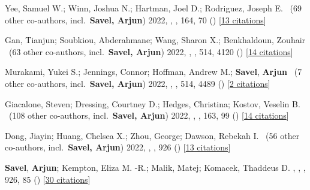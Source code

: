 \item[{\color{numcolor}\scriptsize13}] Yee, Samuel W.; Winn, Joshua N.; Hartman, Joel D.; Rodriguez, Joseph E. \etal\ ({69} other co-authors, incl.\ \textbf{Savel, Arjun}) 2022, , \aj, {164}, 70 () [\href{https://ui.adsabs.harvard.edu/abs/2022AJ....164...70Y}{13 citations}]

\item[{\color{numcolor}\scriptsize12}] Gan, Tianjun; Soubkiou, Abderahmane; Wang, Sharon X.; Benkhaldoun, Zouhair \etal\ ({63} other co-authors, incl.\ \textbf{Savel, Arjun}) 2022, , \mnras, {514}, 4120 () [\href{https://ui.adsabs.harvard.edu/abs/2022MNRAS.514.4120G}{14 citations}]

\item[{\color{numcolor}\scriptsize11}] Murakami, Yukei S.; Jennings, Connor; Hoffman, Andrew M.; \textbf{Savel}, \textbf{Arjun} \etal\ ({7} other co-authors, incl.\ \textbf{Savel, Arjun}) 2022, , \mnras, {514}, 4489 () [\href{https://ui.adsabs.harvard.edu/abs/2022MNRAS.514.4489M}{2 citations}]

\item[{\color{numcolor}\scriptsize10}] Giacalone, Steven; Dressing, Courtney D.; Hedges, Christina; Kostov, Veselin B. \etal\ ({108} other co-authors, incl.\ \textbf{Savel, Arjun}) 2022, , \aj, {163}, 99 () [\href{https://ui.adsabs.harvard.edu/abs/2022AJ....163...99G}{14 citations}]

\item[{\color{numcolor}\scriptsize9}] Dong, Jiayin; Huang, Chelsea X.; Zhou, George; Dawson, Rebekah I. \etal\ ({56} other co-authors, incl.\ \textbf{Savel, Arjun}) 2022, , \apj, {926} () [\href{https://ui.adsabs.harvard.edu/abs/2022ApJ...926L...7D}{13 citations}]

\item[{\color{numcolor}\scriptsize8}] \textbf{Savel}, \textbf{Arjun}; Kempton, Eliza M. -R.; Malik, Matej; Komacek, Thaddeus D. , , \apj, {926}, 85 () [\href{https://ui.adsabs.harvard.edu/abs/2022ApJ...926...85S}{30 citations}]

